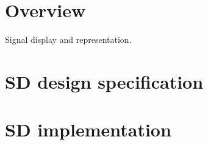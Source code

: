 \section{Overview}
Signal display and representation.

\section{SD design specification}

\section{SD implementation}